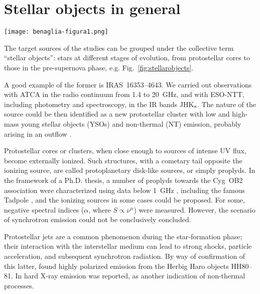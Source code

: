 \documentclass[baaa]{baaa}
\begin{document}
\section{Stellar objects in  general}\label{sec:SOs}

\begin{figure*}[!t]
\centering
\texttt{[image: benaglia-figura1.png]}
\caption{Examples of stellar objects. \emph{Left panel}: Proplyd-like source; continuum emission at 610~MHz, taken with the GMRT (PI: Benaglia), of the Tadpole (northern source), see text and also \citet{isequilla2019}. \emph{Central panel}: colliding-wind region of the binary system HD\,168112; continuum emission at 1.67~GHz, taken with the European VLBI Network \citep{debecker2024}. \emph{Right panel}: Vela~X-1 bow shock, as seen with MeerKAT in L-band \citep[adapted from Fig.~1 of][]{vandenmeer2022}.}
\label{fig:stellarobjects}
\end{figure*}


The target sources of the studies can be grouped under the collective term ``stellar objects'': stars at different stages of evolution, from protostellar cores to those in the pre-supernova phase, e.g. Fig.~\ref{fig:stellarobjects}.

A good example of the former is IRAS~16353--4643. We carried out observations with ATCA in the radio continuum from 1.4 to 20~GHz, and with ESO-NTT, including photometry and spectroscopy, in the IR bands JHK$_{\rm s}$. The nature of the source could be then identified as a new protostellar cluster with low and high-mass young stellar objects (YSOs) and non-thermal (NT) emission, probably arising in an outflow \citep{benagliairas2010}.

Protostellar cores or clusters, when close enough to sources of intense UV flux, become externally ionized. Such structures, with a cometary tail opposite the ionizing source, are called protoplanetary disk-like sources, or simply proplyds. In the framework of a Ph.D. thesis, a number of proplyds towards the Cyg~OB2 association were characterized using data below 1~GHz \citep{isequilla2019}, including the famous Tadpole \citep{sahai2012}, and the ionizing sources in some cases could be  proposed. For some, negative spectral indices ($\alpha$, where $S \propto \nu^\alpha$) were measured. However, the scenario of synchrotron emission could not be conclusively concluded. 

Protostellar jets are a common phenomenon during the star-formation phase; their interaction with the interstellar medium can lead to strong shocks, particle acceleration, and subsequent synchrotron radiation. By way of confirmation of this latter, \citet{carrasco2010} found highly polarized emission from the Herbig Haro objects HH80--81.
In \citet{lopezsantiago2013} hard X-ray emission was reported, as another indication of non-thermal processes. 
\end{document}
